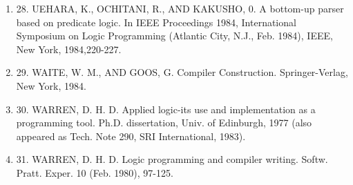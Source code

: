 \begin{enumerate}
  \item 
28. UEHARA, K., OCHITANI, R., AND KAKUSHO, 0. A bottom-up parser based on predicate logic. In
IEEE Proceedings 1984, International Symposium on Logic Programming (Atlantic City, N.J.,
Feb. 1984), IEEE, New York, 1984,220-227.
  \item 
29. WAITE, W. M., AND GOOS, G. Compiler Construction. Springer-Verlag, New York, 1984.
  \item 
30. WARREN, D. H. D. Applied logic-its use and implementation as a programming tool. Ph.D.
dissertation, Univ. of Edinburgh, 1977 (also appeared as Tech. Note 290, SRI International,
1983).
  \item 
31. WARREN, D. H. D. Logic programming and compiler writing. Softw. Pratt. Exper. 10 (Feb.
1980), 97-125. 
\end{enumerate}
 